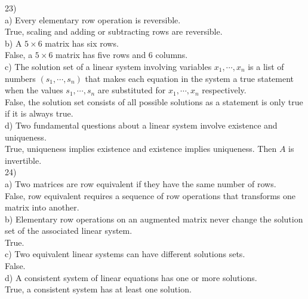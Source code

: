 \documentclass[]{article}
\begin{document}
23) \\

a) Every elementary row operation is reversible.\\
True, scaling and adding or subtracting rows are reversible.\\

b) A $5\times6$ matrix has six rows.\\
False, a $5\times6$ matrix has five rows and 6 columns.\\

c) The solution set of a linear system involving variables $x_1, \cdots, x_n$ is a list of numbers $(s_1,\cdots,s_n)$ that makes each equation in the system a true statement when the values $s_1,\cdots,s_n$ are substituted for $x_1,\cdots, x_n$ respectively.\\
False, the solution set consists of all possible solutions as a statement is only true if it is always true. \\

d) Two fundamental questions about a linear system involve existence and uniqueness.\\
True, uniqueness implies existence and existence implies uniqueness. Then $A$ is invertible.\\

24) \\

a) Two matrices are row equivalent if they have the same number of rows.\\
False, row equivalent requires a sequence of row operations that transforms one matrix into another.\\

b) Elementary row operations on an augmented matrix never change the solution set of the associated linear system.\\
True.\\

c) Two equivalent linear systems can have different solutions sets.\\
False.\\

d) A consistent system of linear equations has one or more solutions.\\
True, a consistent system has at least one solution.\\
\end{document}
